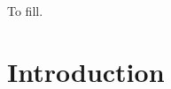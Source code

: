 \documentclass[dissertation,math,vertlayout,pdfa,colorlinks]{aaltoseries}
\begin{document}


\begin{preface}[Espoo]
To fill.

\end{preface}

\clearpage
\tableofcontents


\listofpublications






\chapter{Introduction}
\end{document}
